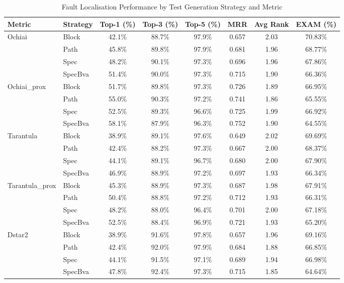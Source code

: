 \begin{table}[htbp]
\centering
\caption{Fault Localisation Performance by Test Generation Strategy and Metric}
\label{tab:metrics_results}
\begin{tabular}{l l c c c c c c}
\hline
\textbf{Metric} & \textbf{Strategy} & \textbf{Top-1 (\%)} & \textbf{Top-3 (\%)} & \textbf{Top-5 (\%)} & \textbf{MRR} & \textbf{Avg Rank} & \textbf{EXAM (\%)} \\
\hline
Ochiai & Block & 42.1\% & 88.7\% & 97.9\% & 0.657 & 2.03 & 70.83\% \\
 & Path & 45.8\% & 89.8\% & 97.9\% & 0.681 & 1.96 & 68.77\% \\
 & Spec & 48.2\% & 90.1\% & 97.3\% & 0.696 & 1.96 & 67.86\% \\
 & SpecBva & 51.4\% & 90.0\% & 97.3\% & 0.715 & 1.90 & 66.36\% \\
\hline
Ochiai\_prox & Block & 51.7\% & 89.8\% & 97.3\% & 0.726 & 1.89 & 66.95\% \\
 & Path & 55.0\% & 90.3\% & 97.2\% & 0.741 & 1.86 & 65.55\% \\
 & Spec & 52.5\% & 89.3\% & 96.6\% & 0.725 & 1.99 & 66.92\% \\
 & SpecBva & 58.1\% & 87.9\% & 96.3\% & 0.752 & 1.90 & 64.55\% \\
\hline
Tarantula & Block & 38.9\% & 89.1\% & 97.6\% & 0.649 & 2.02 & 69.69\% \\
 & Path & 42.4\% & 88.2\% & 97.3\% & 0.667 & 2.00 & 68.37\% \\
 & Spec & 44.1\% & 89.1\% & 96.7\% & 0.680 & 2.00 & 67.90\% \\
 & SpecBva & 46.9\% & 88.9\% & 97.2\% & 0.697 & 1.93 & 66.34\% \\
\hline
Tarantula\_prox & Block & 45.3\% & 88.9\% & 97.3\% & 0.687 & 1.98 & 67.91\% \\
 & Path & 50.4\% & 88.8\% & 97.2\% & 0.712 & 1.93 & 66.31\% \\
 & Spec & 48.2\% & 88.0\% & 96.4\% & 0.701 & 2.00 & 67.18\% \\
 & SpecBva & 52.5\% & 88.4\% & 96.9\% & 0.721 & 1.93 & 65.20\% \\
\hline
Dstar2 & Block & 38.9\% & 91.6\% & 97.8\% & 0.657 & 1.96 & 69.16\% \\
 & Path & 42.4\% & 92.0\% & 97.9\% & 0.684 & 1.88 & 66.85\% \\
 & Spec & 44.1\% & 91.5\% & 97.1\% & 0.689 & 1.94 & 66.98\% \\
 & SpecBva & 47.8\% & 92.4\% & 97.3\% & 0.715 & 1.85 & 64.64\% \\

\end{tabular}
\end{table}
